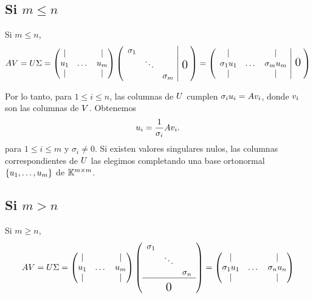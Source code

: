 \subsection{Si $m \le n$}
Si $m \le n$,
$$
\Ab \Vb = \Ub \Sigmab = \begin{pmatrix}  \vert & & \vert \\ \ub_1 & \dots & \ub_m \\ \vert & & \vert \end{pmatrix}
\begin{pmatrix} \begin{array}{ccc|c@{\mskip5mu}}\sigma_1 & & \\ & \ddots & & \text{\Large 0}           \\ & & \sigma_m\end{array}\\      \end{pmatrix} = \begin{pmatrix}
\begin{array}{ccc|c@{\mskip5mu}}\vert & & \vert \\ \sigma_1 \ub_1 & \dots & \sigma_m \ub_m & \text{\Large 0}           \\ \vert & & \vert \end{array}\\
 \end{pmatrix}
$$

Por lo tanto, para $1 \le i \le n$, las columnas de $\Ub$ cumplen $\sigma_i \ub_i = \Ab \vb_i$, donde
$\vb_i$ son las columnas de $\Vb$. Obtenemos
$$
\ub_i = \frac{1}{\sigma_i} \Ab \vb_i.
$$
para $1 \le i \le m$ y $\sigma_i \neq 0$.
Si existen valores singulares nulos, las columnas correspondientes de $\Ub$ las elegimos completando una base ortonormal $\{\ub_1, \dots, \ub_m\}$ de $\mathbb K^{m \times m}$.

\subsection{Si $m > n$}

Si $m \ge n$,
$$
\Ab \Vb = \Ub \Sigmab =  \begin{pmatrix} \vert & & \vert \\ \ub_1 & \dots & \ub_m \\ \vert & & \vert \end{pmatrix}
\left(\begin{array}{ccc}\sigma_1 & & \\ & \ddots & \\ & &  \sigma_n\\\hline         & \rule{0cm}{15pt} \text{\Large 0} &
 \end{array}\right) = \begin{pmatrix} \vert & & \vert \\ \sigma_1 \ub_1 & \dots & \sigma_n \ub_n \\ \vert & & \vert \end{pmatrix}
$$

